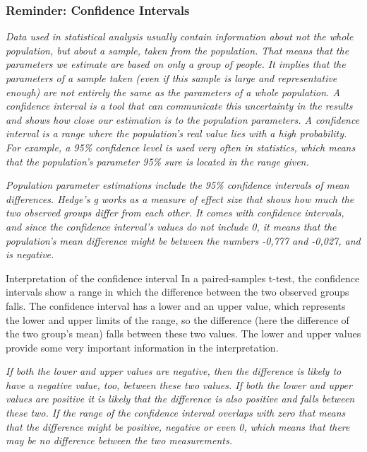 \documentclass[
]{book}
\begin{document}
\hypertarget{reminder-confidence-intervals}{%
\subsubsection{Reminder: Confidence Intervals}\label{reminder-confidence-intervals}}

\emph{Data used in statistical analysis usually contain information about not the whole population, but about a sample, taken from the population. That means that the parameters we estimate are based on only a group of people. It implies that the parameters of a sample taken (even if this sample is large and representative enough) are not entirely the same as the parameters of a whole population. A confidence interval is a tool that can communicate this uncertainty in the results and shows how close our estimation is to the population parameters. A confidence interval is a range where the population's real value lies with a high probability. For example, a 95\% confidence level is used very often in statistics, which means that the population's parameter 95\% sure is located in the range given.}

\emph{Population parameter estimations include the 95\% confidence intervals of mean differences. Hedge's g works as a measure of effect size that shows how much the two observed groups differ from each other. It comes with confidence intervals, and since the confidence interval's values do not include 0, it means that the population's mean difference might be between the numbers -0,777 and -0,027, and is negative.}

Interpretation of the confidence interval
In a paired-samples t-test, the confidence intervals show a range in which the difference between the two observed groups falls. The confidence interval has a lower and an upper value, which represents the lower and upper limits of the range, so the difference (here the difference of the two group's mean) falls between these two values. The lower and upper values provide some very important information in the interpretation.

\emph{If both the lower and upper values are negative, then the difference is likely to have a negative value, too, between these two values. If both the lower and upper values are positive it is likely that the difference is also positive and falls between these two. If the range of the confidence interval overlaps with zero that means that the difference might be positive, negative or even 0, which means that there may be no difference between the two measurements.}
\end{document}
